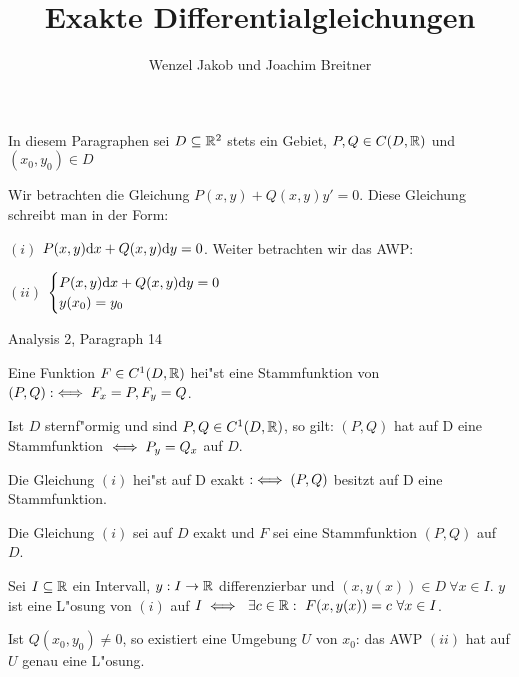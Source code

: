 \documentclass{article}
\title{Exakte Differentialgleichungen}
\author{Wenzel Jakob und Joachim Breitner}
\begin{document}
\maketitle

\begin{vereinbarung}
In diesem Paragraphen sei $D\subseteq\mathbb{R}^2$ stets ein Gebiet, $P, Q\in C(D,\mathbb{R})$
und $(x_0, y_0)\in D$
\end{vereinbarung}
Wir betrachten die Gleichung $P(x,y)+Q(x,y)y'=0$. Diese Gleichung schreibt
man in der Form:
\begin{liste}
\item[$(i)$] $P(x,y)\mathrm{d} x + Q(x,y)\mathrm{d} y =0$. Weiter betrachten wir das AWP:
\item[$(ii)$] $\begin{cases}P(x,y)\mathrm{d} x + Q(x,y)\mathrm{d} y=0 \\ y(x_0)=y_0\end{cases}$
\end{liste}

\begin{erinnerung}
Analysis 2, Paragraph 14
\begin{liste}
\item Eine Funktion $F\in C^1(D,\mathbb{R})$ hei"st eine Stammfunktion von $(P, Q):\iff F_x=P, F_y=Q$.
\item Ist $D$ sternf"ormig und sind $P, Q\in C^1(D,\mathbb{R})$, so gilt: $(P, Q)$ hat auf D eine Stammfunktion
$\iff P_y=Q_x$ auf $D$.
\end{liste}
\end{erinnerung}

\begin{definition}
Die Gleichung $(i)$ hei"st auf D exakt $:\iff (P,Q)$ besitzt auf D eine Stammfunktion.
\end{definition}

\begin{satz*}
Die Gleichung $(i)$ sei auf $D$ exakt und $F$ sei eine Stammfunktion $(P, Q)$ auf $D$.
\begin{liste}
\item Sei $I\subseteq\mathbb{R}$ ein Intervall, $y:I\to\mathbb{R}$ differenzierbar und $(x, y(x))\in D\ \forall x\in I$.
$y$ ist eine L"osung von $(i)$ auf $I\equizu\ \exists c\in\MdR:\ F(x,y(x))=c\ \forall x\in I$.
\item Ist $Q(x_0, y_0)\ne 0$, so existiert eine Umgebung $U$ von $x_0$: das AWP $(ii)$ hat auf $U$
genau eine L"osung.
\end{liste}
\end{satz*}
\end{document}
